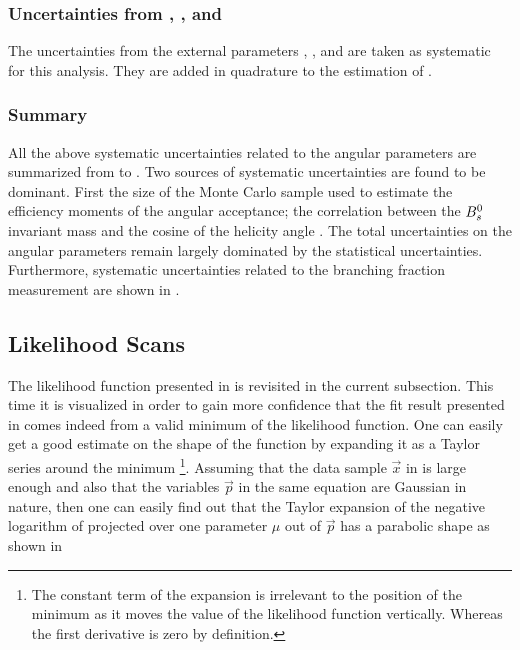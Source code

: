 \subsubsection{Uncertainties from \fdfs, \BRof\BdJpsiKst, and \BRof\BsJpsiPhi}
The uncertainties from the external parameters \fdfs, \BRof\BdJpsiKst, and \BRof\BsJpsiPhi are
taken as systematic for this analysis. They are added in quadrature to the estimation of
\BRof\BsJpsiKst.

\subsubsection{Summary}
\label{systSummary}
All the above systematic uncertainties related to the angular parameters are summarized from 
to . Two sources of systematic uncertainties are found to be dominant. First the size of the Monte
Carlo sample used to estimate the efficiency moments of the angular acceptance; the correlation between the $B^0_s$ invariant
mass and the cosine of the helicity angle \thetamu. The total uncertainties on the angular parameters remain largely dominated
by the statistical uncertainties. Furthermore, systematic uncertainties related to the branching fraction measurement
are shown in .

\subsection{Likelihood Scans}
\label{nllscans}

The likelihood function presented in  is revisited in the current subsection.
This time it is visualized in order to gain more confidence that the fit result presented in 
comes indeed from a valid minimum of the likelihood function. One can easily get a good estimate on the shape of the function
by expanding it as a Taylor series around the
minimum \footnote{The constant term of the
expansion is irrelevant to the position of the minimum as it moves the value of the likelihood function vertically. Whereas
the first derivative is zero by definition.}. Assuming that the data sample $\vec{x}$ in  is large enough
and also that the variables $\vec{p}$ in the same equation are Gaussian in nature, then one can easily find out that the
Taylor expansion of the negative logarithm of  projected over one parameter $\mu$ out of $\vec{p}$ has a
parabolic shape as shown in 


